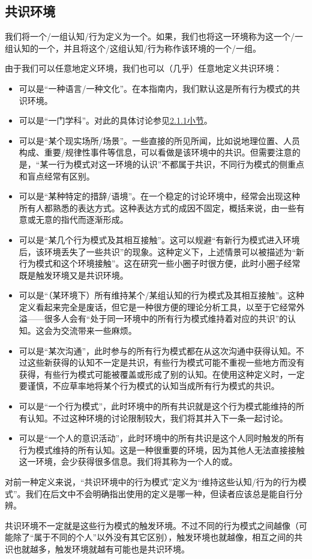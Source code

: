\subsection{共识环境}
我们将一个/一组认知/行为定义为一个。如果，我们也将这一环境称为这一个/一组认知的一个，并且将这个/这组认知/行为称作该环境的一个/一组。
\begin{explain}
由于我们可以任意地定义环境，我们也可以（几乎）任意地定义共识环境：
\begin{itemize}
\item 可以是“一种语言/一种文化”。在本指南内，我们默认这是所有行为模式的共识环境。
\item 可以是“一门学科”。对此的具体讨论参见\hyperref[sec:知识与信息]{2.1.1小节}。
\item 可以是“某个现实场所/场景”。一些直接的所见所闻，比如说地理位置、人员构成、重要/规律性事件等信息，可以看做是该环境中的共识。但需要注意的是，“某一行为模式对这一环境的认识”不都属于共识，不同行为模式的侧重点和盲点经常有区别。
\item 可以是“某种特定的措辞/语境”。在一个稳定的讨论环境中，经常会出现这种所有人都熟悉的表达方式。这种表达方式的成因不固定，概括来说，由一些有意或无意的指代而逐渐形成。
\item 可以是“某几个行为模式及其相互接触”。这可以规避“有新行为模式进入环境后，该环境丢失了一些共识”的现象。这种定义下，上述情景可以被描述为“新行为模式和这个环境接触”。这在研究一些小圈子时很方便，此时小圈子经常既是触发环境又是共识环境。
\item 可以是“（某环境下）所有维持某个/某组认知的行为模式及其相互接触”。这种定义看起来完全是废话，但它是一种很方便的理论分析工具，以至于它经常外溢——很多人会有“处于同一环境中的所有行为模式维持着对应的共识”的认知。这会为交流带来一些麻烦。
\item 可以是“某次沟通”，此时参与的所有行为模式都在从这次沟通中获得认知。不过这些新获得的认知不一定是共识，有些行为模式可能不重视一些地方而没有获得，有些行为模式可能被覆盖或形成了别的认知。在使用这种定义时，一定要谨慎，不应草率地将某个行为模式的认知当成所有行为模式的共识。
\item 可以是“一个行为模式”，此时环境中的所有共识就是这个行为模式能维持的所有认知。不过这种环境的讨论限制较大，我们将其并入下一条一起讨论。
\item 可以是“一个人的意识活动”，此时环境中的所有共识是这个人同时触发的所有行为模式维持的所有认知。这是一种很重要的环境，因为其他人无法直接接触这一环境，会少获得很多信息。我们将其称为一个人的或。
\end{itemize}
对前一种定义来说，“共识环境中的行为模式”定义为“维持这些认知/行为的行为模式”。我们在后文中不会明确指出使用的定义是哪一种，但读者应该总是能自行分辨。

共识环境不一定就是这些行为模式的触发环境。不过不同的行为模式之间越像（可能除了“属于不同的个人”以外没有其它区别），触发环境也就越像，相互之间的共识也就越多，触发环境就越有可能也是共识环境。
\end{explain}

